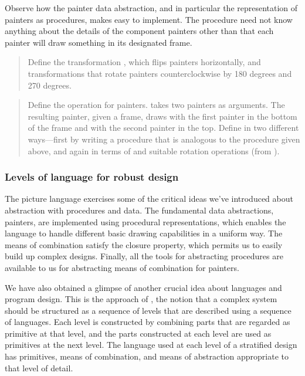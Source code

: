 \noindent
Observe how the painter data abstraction, and in particular the representation
of painters as procedures, makes  easy to implement.  The
 procedure need not know anything about the details of the
component painters other than that each painter will draw something in its
designated frame.

\begin{quote}
 Define the transformation
, which flips painters horizontally, and transformations that
rotate painters counterclockwise by 180 degrees and 270 degrees.
\end{quote}

\begin{quote}
 Define the  operation
for painters.   takes two painters as arguments.  The resulting
painter, given a frame, draws with the first painter in the bottom of the frame
and with the second painter in the top.  Define  in two different
ways---first by writing a procedure that is analogous to the 
procedure given above, and again in terms of  and suitable
rotation operations (from ).
\end{quote}

\subsubsection*{Levels of language for robust design}

The picture language exercises some of the critical ideas we've introduced
about abstraction with procedures and data.  The fundamental data abstractions,
painters, are implemented using procedural representations, which enables the
language to handle different basic drawing capabilities in a uniform way.  The
means of combination satisfy the closure property, which permits us to easily
build up complex designs.  Finally, all the tools for abstracting procedures
are available to us for abstracting means of combination for painters.

We have also obtained a glimpse of another crucial idea about languages and
program design.  This is the approach of , the
notion that a complex system should be structured as a sequence of levels that
are described using a sequence of languages.  Each level is constructed by
combining parts that are regarded as primitive at that level, and the parts
constructed at each level are used as primitives at the next level.  The
language used at each level of a stratified design has primitives, means of
combination, and means of abstraction appropriate to that level of detail.

